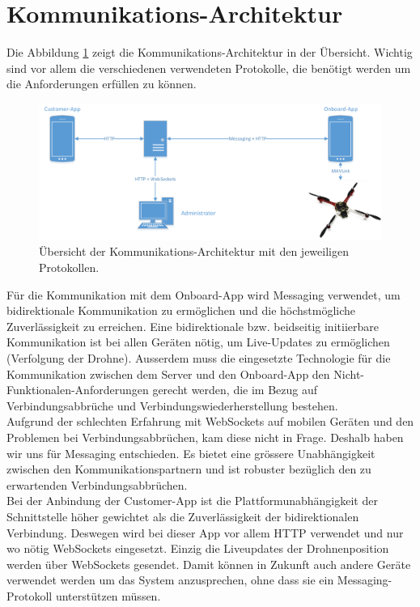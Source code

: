 {\section{Kommunikations-Architektur}
\label{sec:communication-architecture}

Die Abbildung \ref{fig:communication-architecture-overview} zeigt die Kommunikations-Architektur in der Übersicht.
Wichtig sind vor allem die verschiedenen verwendeten Protokolle, die benötigt werden um die Anforderungen erfüllen zu können. \\

\begin{figure}[H]
	\includegraphics[width=1.0\textwidth]{images/Communication-Overview-Diagram.pdf}
	\caption{Übersicht der Kommunikations-Architektur mit den jeweiligen Protokollen. }
	\label{fig:communication-architecture-overview}
\end{figure}


Für die Kommunikation mit dem Onboard-App wird Messaging verwendet, um bidirektionale Kommunikation zu ermöglichen und die höchstmögliche Zuverlässigkeit zu erreichen.
Eine bidirektionale bzw. beidseitig initiierbare Kommunikation ist bei allen Geräten nötig, um Live-Updates zu ermöglichen (Verfolgung der Drohne).
Ausserdem muss die eingesetzte Technologie für die Kommunikation zwischen dem Server und den Onboard-App den Nicht-Funktionalen-Anforderungen gerecht werden, die im Bezug auf Verbindungsabbrüche und Verbindungswiederherstellung bestehen.\\

Aufgrund der schlechten Erfahrung mit WebSockets auf mobilen Geräten und den Problemen bei Verbindungsabbrüchen, kam diese nicht in Frage. Deshalb haben wir uns für Messaging entschieden. Es bietet eine grössere Unabhängigkeit zwischen den Kommunikationspartnern und ist robuster bezüglich den zu erwartenden Verbindungsabbrüchen. \\

Bei der Anbindung der Customer-App ist die Plattformunabhängigkeit der Schnittstelle höher gewichtet als die Zuverlässigkeit der bidirektionalen Verbindung. Deswegen wird bei dieser App vor allem HTTP verwendet und nur wo nötig WebSockets eingesetzt. Einzig die Liveupdates der Drohnenposition werden über WebSockets gesendet. Damit können in Zukunft auch andere Geräte verwendet werden um das System anzusprechen, ohne dass sie ein Messaging-Protokoll unterstützen müssen.\\

}
